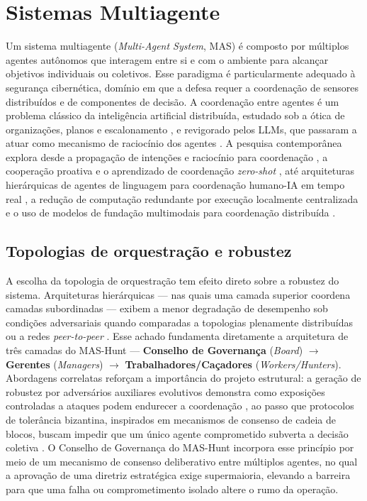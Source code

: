 \section{Sistemas Multiagente}
\label{sec:mas}

Um sistema multiagente (\textit{Multi-Agent System}, MAS) é composto por múltiplos agentes autônomos que interagem entre si e com o ambiente para alcançar objetivos individuais ou coletivos. Esse paradigma é particularmente adequado à segurança cibernética, domínio em que a defesa requer a coordenação de sensores distribuídos e de componentes de decisão. A coordenação entre agentes é um problema clássico da inteligência artificial distribuída, estudado sob a ótica de organizações, planos e escalonamento \cite{durfee1993organizations}, e revigorado pelos LLMs, que passaram a atuar como mecanismo de raciocínio dos agentes \cite{agashe2023llmcoordination}. A pesquisa contemporânea explora desde a propagação de intenções e raciocínio para coordenação \cite{qiu2024collaborativeintelligencepropagatingintentions}, a cooperação proativa \cite{DBLP:journals/corr/abs-2308-11339} e o aprendizado de coordenação \textit{zero-shot} \cite{pmlr-v202-li23au}, até arquiteturas hierárquicas de agentes de linguagem para coordenação humano-IA em tempo real \cite{liu2023llm}, a redução de computação redundante por execução localmente centralizada \cite{bai2024reducingredundantcomputationmultiagent} e o uso de modelos de fundação multimodais para coordenação distribuída \cite{mahmud2025distributedmultiagentcoordinationusing}.

\subsection{Topologias de orquestração e robustez}
\label{subsec:topologias}

A escolha da topologia de orquestração tem efeito direto sobre a robustez do sistema. Arquiteturas hierárquicas — nas quais uma camada superior coordena camadas subordinadas — exibem a menor degradação de desempenho sob condições adversariais quando comparadas a topologias plenamente distribuídas ou a redes \textit{peer-to-peer} \cite{huang2024resilience}. Esse achado fundamenta diretamente a arquitetura de três camadas do MAS-Hunt — \textbf{Conselho de Governança} (\textit{Board}) $\rightarrow$ \textbf{Gerentes} (\textit{Managers}) $\rightarrow$ \textbf{Trabalhadores/Caçadores} (\textit{Workers/Hunters}). Abordagens correlatas reforçam a importância do projeto estrutural: a geração de robustez por adversários auxiliares evolutivos demonstra como exposições controladas a ataques podem endurecer a coordenação \cite{Yuan_Zhang_Xue_Yin_Chen_Guan_Li_Qian_Yu_2023}, ao passo que protocolos de tolerância bizantina, inspirados em mecanismos de consenso de cadeia de blocos, buscam impedir que um único agente comprometido subverta a decisão coletiva \cite{doe2023emergent}. O Conselho de Governança do MAS-Hunt incorpora esse princípio por meio de um mecanismo de consenso deliberativo entre múltiplos agentes, no qual a aprovação de uma diretriz estratégica exige supermaioria, elevando a barreira para que uma falha ou comprometimento isolado altere o rumo da operação.

